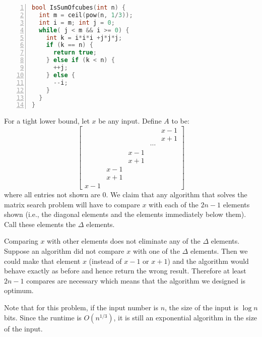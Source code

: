 \newpage
\begin{lstlisting}[basicstyle=\footnotesize,numbers=left,breaklines=true,language=C++]
bool IsSumOfcubes(int n) {
  int m = ceil(pow(n, 1/3));
  int i = m; int j = 0;
  while( j < m && i >= 0) {
    int k = i*i*i +j*j*j;
    if (k == n) {
      return true;
    } else if (k < n) {
      ++j;
    } else {
      --i;
    }
  }
}
\end{lstlisting}

For a tight lower bound, let $x$ be any input. Define $A$ to be:
\[
\left[
\begin{array}{lllll}
 & & & & x-1 \\
 & & & & x+1 \\
 & & & \cdots &     \\
 & &x-1 & &     \\
 & &x+1 & &     \\
 &x-1 & & &     \\
 &x+1 & & &     \\
x -1 & & & &    
\end{array}
\right] 
\] where all entries not shown are 0.
We claim that any algorithm that solves the matrix search problem will have to compare
$x$ with each of the $2n-1$ elements
shown (i.e., the diagonal elements and the elements immediately below them).
Call these elements the $\Delta$ elements.

Comparing $x$ with other elements does not eliminate any of the $\Delta$ elements.
Suppose an algorithm did not compare $x$ with one of the $\Delta$ elements.
Then we could make that element $x$ (instead of $x-1$ or $x+1$) and the algorithm
would behave exactly as before and hence return the wrong result. Therefore
at least $2n-1$ compares are necessary which means that the algorithm we designed is optimum.

Note that for this problem, if the input number is $n$, the size of
the input is $\log n$ bits. Since the runtime is $O(n^{1/3})$, it is
still an exponential algorithm in the size of the input.

